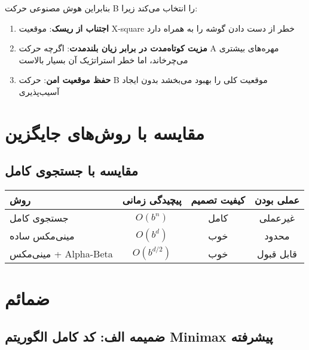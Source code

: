 \documentclass[12pt]{article}
\begin{document}
	بنابراین هوش مصنوعی حرکت B را انتخاب می‌کند زیرا:
	
	\begin{enumerate}
		\item \textbf{اجتناب از ریسک}: موقعیت X-square خطر از دست دادن گوشه را به همراه دارد
		\item \textbf{مزیت کوتاه‌مدت در برابر زیان بلندمدت}: اگرچه حرکت A مهره‌های بیشتری می‌چرخاند، اما خطر استراتژیک آن بسیار بالاست
		\item \textbf{حفظ موقعیت امن}: حرکت B موقعیت کلی را بهبود می‌بخشد بدون ایجاد آسیب‌پذیری
	\end{enumerate}
	
	\section{مقایسه با روش‌های جایگزین}
	
	\subsection{مقایسه با جستجوی کامل}
	
	\begin{center}
		\begin{tabular}{|l|c|c|c|}
			\hline
			\textbf{روش} & \textbf{پیچیدگی زمانی} & \textbf{کیفیت تصمیم} & \textbf{عملی بودن} \\
			\hline
			جستجوی کامل & $O(b^n)$ & کامل & غیرعملی \\
			\hline
			مینی‌مکس ساده & $O(b^d)$ & خوب & محدود \\
			\hline
			مینی‌مکس + Alpha-Beta & $O(b^{d/2})$ & خوب & قابل قبول \\
			\hline
		\end{tabular}
	\end{center}
	
	
	\section{ضمائم}
	
	\subsection{ضمیمه الف: کد کامل الگوریتم Minimax پیشرفته}
	
\end{document}
